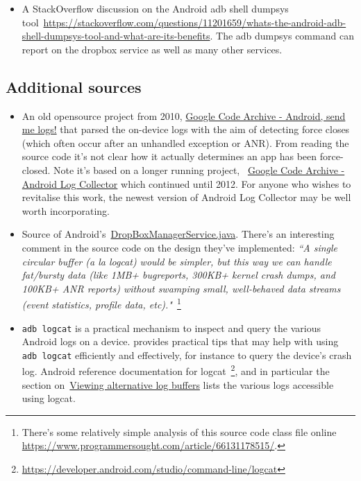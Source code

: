 \begin{itemize}
    \item A StackOverflow discussion on the Android adb shell dumpsys tool~\url{https://stackoverflow.com/questions/11201659/whats-the-android-adb-shell-dumpsys-tool-and-what-are-its-benefits}. The adb dumpsys command can report on the dropbox service as well as many other services. 
\end{itemize}

\subsection{Additional sources}
\begin{itemize}
    \item An old opensource project from 2010, \href{https://code.google.com/archive/p/android-send-me-logs/}{Google Code Archive - Android, send me logs!} that parsed the on-device logs with the aim of detecting force closes (which often occur after an unhandled exception or ANR). From reading the source code it's not clear how it actually determines an app has been force-closed. Note it's based on a longer running project, ~\href{https://code.google.com/archive/p/android-log-collector/}{Google Code Archive - Android Log Collector} which continued until 2012. For anyone who wishes to revitalise this work, the newest version of Android Log Collector may be well worth incorporating.
    
    \item Source of Android's~\href{https://android.googlesource.com/platform/frameworks/base/+/master/services/core/java/com/android/server/DropBoxManagerService.java}{DropBoxManagerService.java}. There's an interesting comment in the source code on the design they've implemented: \emph{``A single circular buffer (a la logcat) would be simpler, but this way we can handle fat/bursty data (like 1MB+ bugreports, 300KB+ kernel crash dumps, and 100KB+ ANR reports) without swamping small, well-behaved data streams (event statistics, profile data, etc)."}~\footnote{There's some relatively simple analysis of this source code class file online \url{https://www.programmersought.com/article/66131178515/}.}
    
    \item \texttt{adb logcat} is a practical mechanism to inspect and query the various Android logs on a device. \citep{khan2019_medium_filtering_adb_logcat_efficiently} provides practical tips that may help with using \texttt{adb logcat} efficiently and effectively, for instance to query the device's crash log. Android reference documentation for logcat~\footnote{\url{https://developer.android.com/studio/command-line/logcat}}, and in particular the section on~\href{https://developer.android.com/studio/command-line/logcat#alternativeBuffers}{Viewing alternative log buffers} lists the various logs accessible using logcat.
    

\end{itemize}
